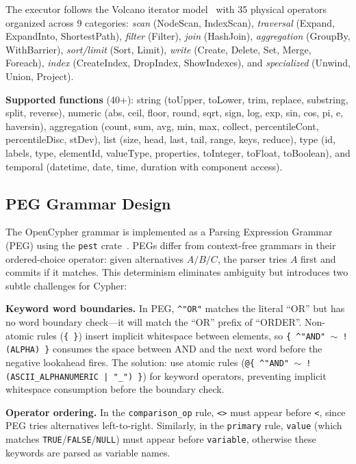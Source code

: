 \documentclass[sigconf, nonacm]{acmart}
\begin{document}
The executor follows the Volcano iterator model~\cite{graefe1994volcano} with 35 physical operators organized across 9 categories:
\emph{scan} (NodeScan, IndexScan),
\emph{traversal} (Expand, ExpandInto, ShortestPath),
\emph{filter} (Filter),
\emph{join} (HashJoin),
\emph{aggregation} (GroupBy, WithBarrier),
\emph{sort/limit} (Sort, Limit),
\emph{write} (Create, Delete, Set, Merge, Foreach),
\emph{index} (CreateIndex, DropIndex, ShowIndexes),
and \emph{specialized} (Unwind, Union, Project).

\textbf{Supported functions} (40+): string (toUpper, toLower, trim, replace, substring, split, reverse), numeric (abs, ceil, floor, round, sqrt, sign, log, exp, sin, cos, pi, e, haversin), aggregation (count, sum, avg, min, max, collect, percentileCont, percentileDisc, stDev), list (size, head, last, tail, range, keys, reduce), type (id, labels, type, elementId, valueType, properties, toInteger, toFloat, toBoolean), and temporal (datetime, date, time, duration with component access).

\subsection{PEG Grammar Design}

The OpenCypher grammar is implemented as a Parsing Expression Grammar (PEG) using the \texttt{pest} crate~\cite{ford2004peg}.
PEGs differ from context-free grammars in their ordered-choice operator: given alternatives $A / B / C$, the parser tries $A$ first and commits if it matches.
This determinism eliminates ambiguity but introduces two subtle challenges for Cypher:

\textbf{Keyword word boundaries.}
In PEG, \texttt{\^{}"OR"} matches the literal ``OR'' but has no word boundary check---it will match the ``OR'' prefix of ``ORDER''.
Non-atomic rules (\texttt{\{ \}}) insert implicit whitespace between elements, so \texttt{\{ \^{}"AND" $\sim$ !(ALPHA) \}} consumes the space between AND and the next word before the negative lookahead fires.
The solution: use atomic rules (\texttt{@\{ \^{}"AND" $\sim$ !(ASCII\_ALPHANUMERIC | "\_") \}}) for keyword operators, preventing implicit whitespace consumption before the boundary check.

\textbf{Operator ordering.}
In the \texttt{comparison\_op} rule, \texttt{<>} must appear before \texttt{<}, since PEG tries alternatives left-to-right.
Similarly, in the \texttt{primary} rule, \texttt{value} (which matches \texttt{TRUE}/\texttt{FALSE}/\texttt{NULL}) must appear before \texttt{variable}, otherwise these keywords are parsed as variable names.
\end{document}
